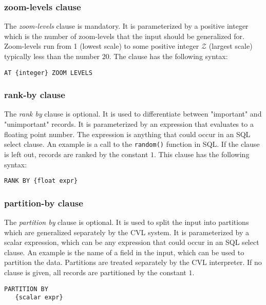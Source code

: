 \subsubsection{zoom-levels clause}

The \emph{zoom-levels} clause is mandatory. It is parameterized by a positive integer which is the number of zoom-levels that the input should be generalized for. Zoom-levels run from 1 (lowest scale) to some positive integer $\mathcal{Z}$ (largest scale) typically less than the number 20. The clause has the following syntax:

\begin{lstlisting}
AT {integer} ZOOM LEVELS
\end{lstlisting}

\subsubsection{rank-by clause}

The \emph{rank by} clause is optional. It is used to differentiate between "important" and "unimportant" records. It is parameterized by an expression that evaluates to a floating point number. The expression is anything that could occur in an SQL select clause. An example is a call to the \texttt{random()} function in SQL. If the clause is left out, records are ranked by the constant $1$. This clause has the following syntax:

\begin{lstlisting}
RANK BY {float expr}
\end{lstlisting}

\subsubsection{partition-by clause}

The \emph{partition by} clause is optional. It is used to split the input into partitions which are generalized separately by the CVL system. It is parameterized by a scalar expression, which can be any expression that could occur in an SQL select clause. An example is the name of a field in the input, which can be used to partition the data. Partitions are treated separately by the CVL interpreter. If no clause is given, all records are partitioned by the constant $1$. 

\begin{lstlisting}
PARTITION BY
   {scalar expr}
\end{lstlisting}

